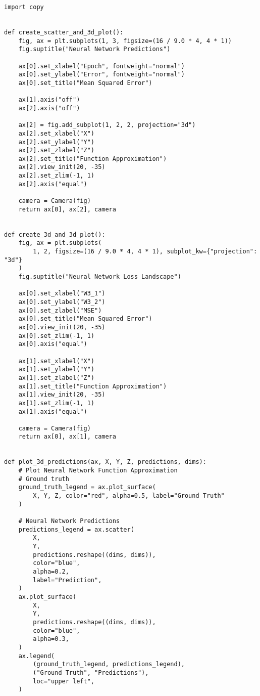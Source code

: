 \documentclass[openany]{book}
\begin{document}
\begin{tcolorbox}
\tiny
\begin{verbatim}
import copy


def create_scatter_and_3d_plot():
    fig, ax = plt.subplots(1, 3, figsize=(16 / 9.0 * 4, 4 * 1))
    fig.suptitle("Neural Network Predictions")

    ax[0].set_xlabel("Epoch", fontweight="normal")
    ax[0].set_ylabel("Error", fontweight="normal")
    ax[0].set_title("Mean Squared Error")

    ax[1].axis("off")
    ax[2].axis("off")

    ax[2] = fig.add_subplot(1, 2, 2, projection="3d")
    ax[2].set_xlabel("X")
    ax[2].set_ylabel("Y")
    ax[2].set_zlabel("Z")
    ax[2].set_title("Function Approximation")
    ax[2].view_init(20, -35)
    ax[2].set_zlim(-1, 1)
    ax[2].axis("equal")

    camera = Camera(fig)
    return ax[0], ax[2], camera


def create_3d_and_3d_plot():
    fig, ax = plt.subplots(
        1, 2, figsize=(16 / 9.0 * 4, 4 * 1), subplot_kw={"projection": "3d"}
    )
    fig.suptitle("Neural Network Loss Landscape")

    ax[0].set_xlabel("W3_1")
    ax[0].set_ylabel("W3_2")
    ax[0].set_zlabel("MSE")
    ax[0].set_title("Mean Squared Error")
    ax[0].view_init(20, -35)
    ax[0].set_zlim(-1, 1)
    ax[0].axis("equal")

    ax[1].set_xlabel("X")
    ax[1].set_ylabel("Y")
    ax[1].set_zlabel("Z")
    ax[1].set_title("Function Approximation")
    ax[1].view_init(20, -35)
    ax[1].set_zlim(-1, 1)
    ax[1].axis("equal")

    camera = Camera(fig)
    return ax[0], ax[1], camera


def plot_3d_predictions(ax, X, Y, Z, predictions, dims):
    # Plot Neural Network Function Approximation
    # Ground truth
    ground_truth_legend = ax.plot_surface(
        X, Y, Z, color="red", alpha=0.5, label="Ground Truth"
    )

    # Neural Network Predictions
    predictions_legend = ax.scatter(
        X,
        Y,
        predictions.reshape((dims, dims)),
        color="blue",
        alpha=0.2,
        label="Prediction",
    )
    ax.plot_surface(
        X,
        Y,
        predictions.reshape((dims, dims)),
        color="blue",
        alpha=0.3,
    )
    ax.legend(
        (ground_truth_legend, predictions_legend),
        ("Ground Truth", "Predictions"),
        loc="upper left",
    )



\end{verbatim}
\end{tcolorbox}
\end{document}
